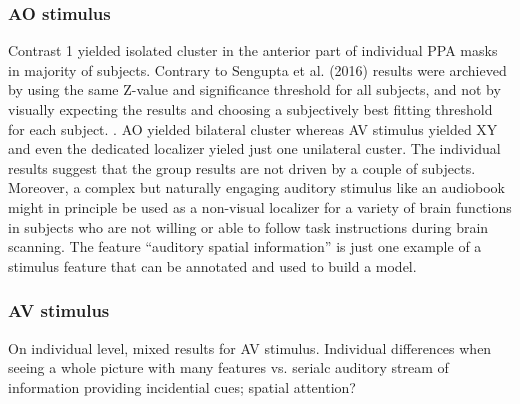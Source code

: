 \documentclass[english]{article}
\begin{document}
\subsubsection{AO stimulus}
Contrast 1 yielded isolated cluster in the anterior part of individual PPA masks
in majority of subjects.
Contrary to Sengupta et al. (2016) results were archieved by using the same
Z-value and significance threshold for all subjects, and not by visually
expecting the results and choosing a subjectively best fitting threshold for
each subject.
.
AO yielded bilateral cluster whereas AV stimulus yielded XY and even the
dedicated localizer yieled just one unilateral custer.
The individual results suggest that the group results are not driven by a couple
of subjects.
Moreover, a complex but naturally engaging auditory stimulus like an audiobook
might in principle be used as a non-visual localizer for a variety of brain
functions in subjects who are not willing or able to follow task instructions
during brain scanning.
The feature ``auditory spatial information'' is just one
example of a stimulus feature that can be annotated and used to build a model.


\subsubsection{AV stimulus}
On individual level, mixed results for AV stimulus.
Individual differences when seeing a whole picture with many features vs.
serialc auditory stream of information providing incidential cues; spatial attention?
\end{document}

